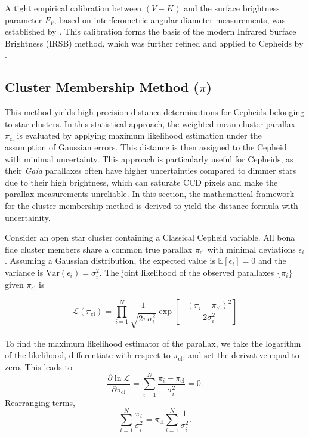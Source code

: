 A tight empirical calibration between $(V-K)$ and the surface brightness parameter $F_V$, based on interferometric angular diameter measurements, was established by \cite{1997Fouque}. This calibration forms the basis of the modern Infrared Surface Brightness (IRSB) method, which was further refined and applied to Cepheids by \cite{2011storm}.

\subsection{Cluster Membership Method ($\bar{\pi}$)}

This method yields high-precision distance determinations for Cepheids belonging to star clusters. In this statistical approach, the weighted mean cluster parallax $\pi_{\mathrm{cl}}$ is evaluated by applying maximum likelihood estimation under the assumption of Gaussian errors. This distance is then assigned to the Cepheid with minimal uncertainty. This approach is particularly useful for Cepheids, as their \textit{Gaia} parallaxes often have higher uncertainties compared to dimmer stars due to their high brightness, which can saturate CCD pixels and make the parallax measurements unreliable. In this section, the mathematical framework for the cluster membership method is derived to yield the distance formula with uncertainity.

Consider an open star cluster containing a Classical Cepheid variable. All bona fide cluster members share a common true parallax $\pi_{\mathrm{cl}}$ with minimal deviations $\epsilon_i$. Assuming a Gaussian distribution, the expected value is $\mathbb{E}[\epsilon_i] = 0$ and the variance is $\mathrm{Var}(\epsilon_i) = \sigma_i^2$. The joint likelihood of the observed parallaxes $\{\pi_i\}$ given $\pi_{\mathrm{cl}}$ is

\begin{equation}
\mathcal{L}(\pi_{\mathrm{cl}}) = \prod_{i=1}^N \frac{1}{\sqrt{2\pi\sigma_i^2}} \exp\!\left[ -\frac{(\pi_i - \pi_{\mathrm{cl}})^2}{2\sigma_i^2} \right]
\end{equation}


To find the maximum likelihood estimator of the parallax, we take the logarithm of the likelihood, differentiate with respect to $\pi_{\mathrm{cl}}$, and set the derivative equal to zero. This leads to
\begin{equation}
\frac{\partial \ln \mathcal{L}}{\partial \pi_{\mathrm{cl}}}
=
\sum_{i=1}^N
\frac{\pi_i - \pi_{\mathrm{cl}}}{\sigma_i^2}
= 0.
\end{equation}
Rearranging terms,
\begin{equation}
\sum_{i=1}^N \frac{\pi_i}{\sigma_i^2} = \pi_{\mathrm{cl}} \sum_{i=1}^N \frac{1}{\sigma_i^2}.
\end{equation}

